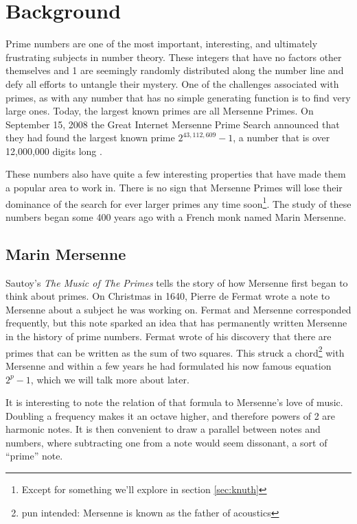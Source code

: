 \section{Background}

Prime numbers are one of the most important, interesting, and ultimately frustrating subjects in number theory. These integers that have no factors other themselves and 1 are seemingly randomly distributed along the number line and defy all efforts to untangle their mystery. One of the challenges associated with primes, as with any number that has no simple generating function is to find very large ones.  Today, the largest known primes are all Mersenne Primes.  On September 15, 2008 the Great Internet Mersenne Prime Search announced that they had found the largest known prime $2^{43,112,609}-1$, a number that is over 12,000,000 digits long \cite{gimps}.     

These numbers also have quite a few interesting properties that have made them a popular area to work in. There is no sign that Mersenne Primes will lose their dominance of the search for ever larger primes any time soon\footnote{Except for something we'll explore in section \ref{sec:knuth}}.  The study of these numbers began some 400 years ago with a French monk named Marin Mersenne. 

\subsection{Marin Mersenne}

Sautoy's \textit{The Music of The Primes} \cite{sautoy} tells the story of how Mersenne first began to think about primes. On Christmas in 1640, Pierre de Fermat wrote a note to Mersenne about a subject he was working on. Fermat and Mersenne corresponded frequently, but this note sparked an idea that has permanently written Mersenne in the history of prime numbers. Fermat wrote of his discovery that there are primes that can be written as the sum of two squares.  This struck a chord\footnote{pun intended: Mersenne is known as the father of acoustics} with Mersenne and within a few years he had formulated his now famous equation $2^p - 1$, which we will talk more about later.  

It is interesting to note the relation of that formula to Mersenne's love of music.  Doubling a frequency makes it an octave higher, and therefore powers of 2 are harmonic notes.  It is then convenient to draw a parallel between notes and numbers, where subtracting one from  a note would seem dissonant, a sort of ``prime'' note. 

